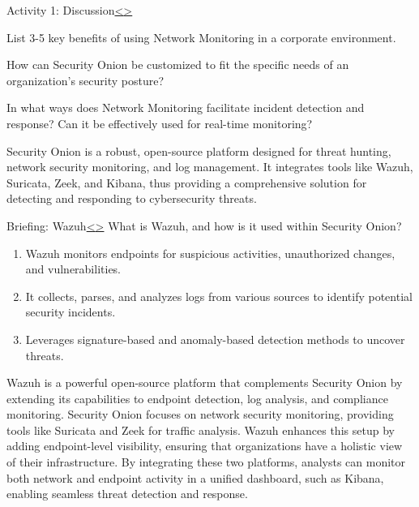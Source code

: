 \documentclass[12pt]{article}
\newenvironment{instructionblock}{\Large\bgroup}{\egroup}
\begin{document}
\begin{slide}{Activity 1: Discussion}{\hyperref[slide 4]{\textless}\hyperref[slide 6]{\textgreater}}
	\vskip 10pt
	\begin{instructionblock}
		
		List 3-5 key benefits of using Network Monitoring in a corporate environment.
		
		\bigskip
		\bigskip
		
		How can Security Onion be customized to fit the specific needs of an organization’s security posture?

        \bigskip
        \bigskip

        In what ways does Network Monitoring facilitate incident detection and response? Can it be effectively used for real-time monitoring?

	\end{instructionblock}
\end{slide}


Security Onion is a robust, open-source platform designed for threat hunting, network security monitoring, and log management. It integrates tools like Wazuh, Suricata, Zeek, and Kibana, thus providing a comprehensive solution for detecting and responding to cybersecurity threats.

\pagebreak
\begin{slide}{Briefing: Wazuh}{\hyperref[slide 5]{\textless}\hyperref[slide 7]{\textgreater}}
	\vskip 10pt
	\begin{instructionblock}
		What is Wazuh, and how is it used within Security Onion?
		\begin{enumerate}
			\item Wazuh monitors endpoints for suspicious activities, unauthorized changes, and vulnerabilities.
			\item It collects, parses, and analyzes logs from various sources to identify potential security incidents.
			\item Leverages signature-based and anomaly-based detection methods to uncover threats.
		\end{enumerate}
	\end{instructionblock}
\end{slide}


Wazuh is a powerful open-source platform that complements Security Onion by extending its capabilities to endpoint detection, log analysis, and compliance monitoring. Security Onion focuses on network security monitoring, providing tools like Suricata and Zeek for traffic analysis. Wazuh enhances this setup by adding endpoint-level visibility, ensuring that organizations have a holistic view of their infrastructure. By integrating these two platforms, analysts can monitor both network and endpoint activity in a unified dashboard, such as Kibana, enabling seamless threat detection and response.
\end{document}
